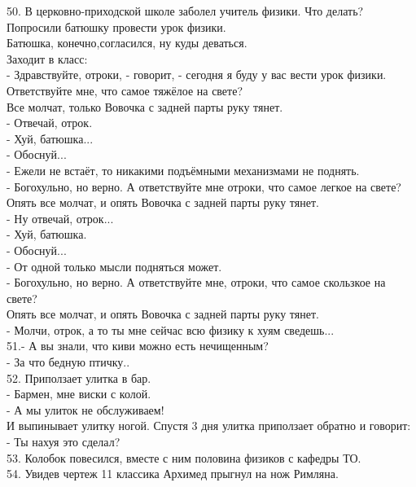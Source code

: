 \documentclass[a4paper,20pt,notitlepage]{extbook}
\begin{document}
	50. В церковно-приходской школе заболел учитель физики. Что делать? Попросили батюшку провести урок физики.\\
	 Батюшка, конечно,согласился, ну куды деваться.\\
	Заходит в класс:\\
	- Здравствуйте, отроки, - говорит, - сегодня я буду у вас вести урок физики. Ответствуйте мне, что самое тяжёлое на свете?\\
	Все молчат, только Вовочка с задней парты руку тянет.\\
	- Отвечай, отрок.\\
	- Хуй, батюшка...\\
	- Обоснуй...\\
	- Ежели не встаёт, то никакими подъёмными механизмами не поднять.\\
	- Богохульно, но верно. А ответствуйте мне отроки, что самое легкое на свете?\\
	Опять все молчат, и опять Вовочка с задней парты руку тянет.\\
	- Ну отвечай, отрок...\\
	- Хуй, батюшка.\\
	- Обоснуй...\\
	- От одной только мысли подняться может.\\
	- Богохульно, но верно. А ответствуйте мне, отроки, что самое скользкое на свете?\\
	Опять все молчат, и опять Вовочка с задней парты руку тянет.\\
	- Молчи, отрок, а то ты мне сейчас всю физику к хуям сведешь...\\
	
	51.- А вы знали, что киви можно есть нечищенным?\\
	- За что бедную птичку..\\
	
	52. Приползает улитка в бар.\\
	- Бармен, мне виски с колой.\\
	- А мы улиток не обслуживаем!\\
	И выпинывает улитку ногой. Спустя 3 дня улитка приползает обратно и говорит:\\
	- Ты нахуя это сделал?\\

	53. Колобок повесился, вместе с ним половина физиков с кафедры ТО.\\
	
	54. Увидев чертеж 11 классика Архимед прыгнул на нож Римляна.\\
	
\end{document}
